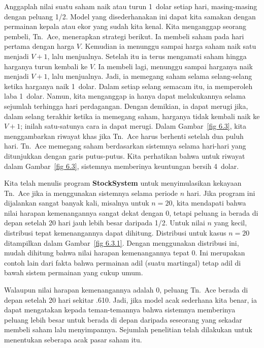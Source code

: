 \begin{example}\label{exam 6.12} Anggaplah nilai suatu saham naik atau turun 1~dolar
setiap hari, masing-masing dengan peluang 1/2. Model yang disederhanakan ini dapat kita
samakan dengan permainan kepala atau ekor yang sudah kita kenal. Kita menganggap
seorang pembeli, Tn.\ Ace, menerapkan strategi berikut. Ia membeli
saham pada hari pertama dengan harga $V$. Kemudian ia menunggu sampai harga saham naik
satu menjadi $V + 1$, lalu menjualnya. Setelah itu ia terus mengamati saham hingga
harganya turun kembali ke $V$. Ia membeli lagi, menunggu sampai harganya naik menjadi
$V + 1$, lalu menjualnya. Jadi, ia memegang saham selama selang-selang ketika harganya
naik 1~dolar. Dalam setiap selang semacam itu, ia memperoleh laba 1~dolar. Namun, kita
menganggap ia hanya dapat melakukannya selama sejumlah terhingga hari perdagangan.
Dengan demikian, ia dapat merugi jika, dalam selang terakhir ketika ia memegang saham,
harganya tidak kembali naik ke $V + 1$; inilah satu-satunya cara ia dapat merugi.
Dalam Gambar~\ref{fig 6.3}, kita menggambarkan riwayat khas jika Tn.\ Ace harus
berhenti setelah dua puluh hari.
Tn.\ Ace memegang saham berdasarkan sistemnya selama hari-hari yang ditunjukkan dengan
garis putus-putus. Kita perhatikan bahwa untuk riwayat dalam Gambar~\ref{fig 6.3},
sistemnya memberinya keuntungan bersih 4~dolar.
\par
Kita telah menulis program {\bf StockSystem} untuk
menyimulasikan kekayaan Tn.\ Ace jika ia menggunakan sistemnya selama periode $n$
hari. Jika program ini dijalankan sangat banyak kali, misalnya untuk $n = 20$, kita
mendapati bahwa nilai harapan kemenangannya sangat dekat dengan 0, tetapi peluang ia
berada di depan setelah 20 hari jauh lebih besar daripada 1/2. Untuk nilai $n$ yang
kecil, distribusi tepat kemenangannya dapat dihitung. Distribusi untuk kasus $n = 20$
ditampilkan dalam Gambar~\ref{fig 6.3.1}. Dengan menggunakan distribusi ini, mudah
dihitung bahwa nilai harapan kemenangannya tepat 0. Ini merupakan contoh lain dari
fakta bahwa permainan adil (suatu martingal) tetap adil di bawah
sistem permainan yang cukup umum.
\par
Walaupun nilai harapan kemenangannya adalah 0, peluang Tn.\ Ace berada di depan setelah
20 hari sekitar .610. Jadi, jika model acak sederhana kita benar, ia dapat mengatakan
kepada teman-temannya bahwa sistemnya memberinya peluang lebih besar untuk berada di
depan daripada seseorang yang sekadar membeli saham lalu menyimpannya. Sejumlah
penelitian telah dilakukan untuk menentukan seberapa acak pasar saham itu.
\end{example}


